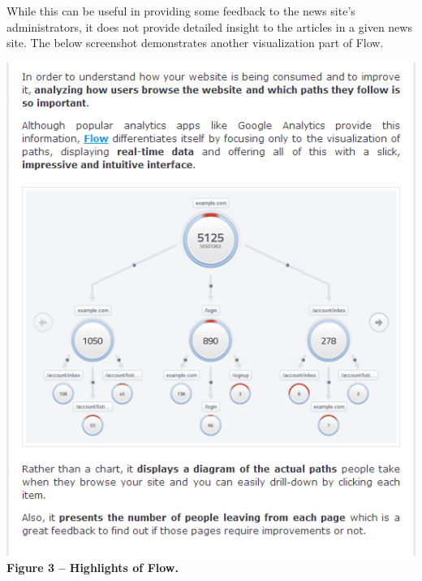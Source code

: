 \documentclass[12pt]{article}
\begin{document}
While this can be useful in providing some feedback to the news site's administrators, it does not provide detailed insight to the articles in a given news site. The below screenshot demonstrates another visualization part of Flow. \\

\vfill

\noindent\includegraphics[scale=0.7]{img/flow1} \\
\noindent\textbf{Figure 3 -- Highlights of Flow.} \\

\newpage
\end{document}
